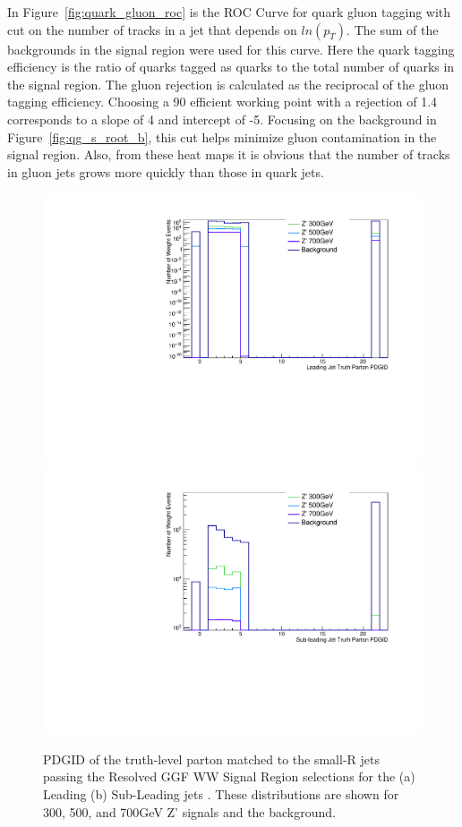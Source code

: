 In Figure~\ref{fig:quark_gluon_roc} is the ROC Curve for quark gluon tagging with cut on the number of tracks in a jet that depends on $ln(p_{T})$. The sum of the backgrounds in the signal region were used for this curve. Here the quark tagging efficiency is the ratio of quarks tagged as quarks to the total number of quarks in the signal region. The gluon rejection is calculated as the reciprocal of the gluon tagging efficiency. Choosing a 90 efficient working point with a rejection of 1.4 corresponds to a slope of 4 and intercept of -5. Focusing on the background in Figure~\ref{fig:qg_s_root_b}, this cut helps minimize gluon contamination in the signal region. Also, from these heat maps it is obvious that the number of tracks in gluon jets grows more quickly than those in quark jets.
\pagebreak

\begin{figure}[h!]
  \centering
  \includegraphics[width=0.45\hsize]{figures/QGT/sigWJ1_pdgid_Pass_Res_GGF_WW_SR.pdf}
 \includegraphics[width=0.45\hsize]{figures/QGT/sigWJ2_pdgid_Pass_Res_GGF_WW_SR.pdf}
  \caption{PDGID of the truth-level parton matched to the small-R jets passing the Resolved GGF WW Signal Region selections for the (a) Leading (b) Sub-Leading jets . These distributions are shown for 300, 500, and 700GeV Z' signals and the background.}
  \label{fig:diag_pdgid}
\end{figure}
\FloatBarrier



